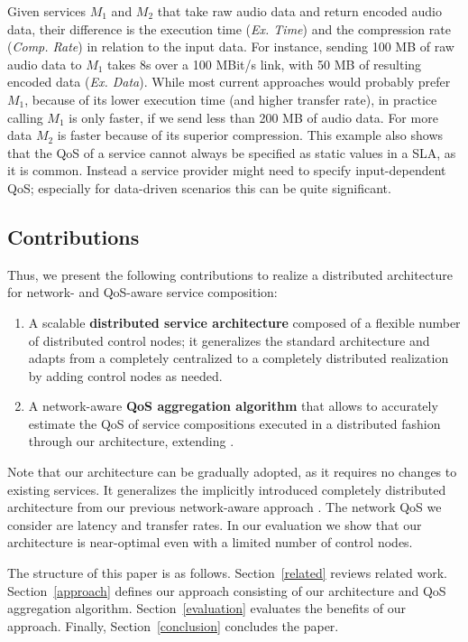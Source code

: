 \documentclass[10pt, conference, compsocconf]{IEEEtran}
\begin{document}
\noindent Given services $M_1$ and $M_2$ that take raw audio data
	and return encoded audio data,
		their difference is the execution time (\textit{Ex. Time}) and the compression rate (\textit{Comp. Rate}) in relation to the input data.
For instance, sending 100 MB of raw audio data to $M_1$ takes 8s over a 100 MBit/s link,
	with 50 MB of resulting encoded data (\textit{Ex. Data}).
While most current approaches would probably prefer $M_1$, because of its lower execution time (and higher transfer rate),
	in practice calling $M_1$ is only faster, if we send less than 200 MB of audio data.
For more data $M_2$ is faster because of its superior compression. 
This example also shows that the QoS of a service cannot always be specified as static values in a SLA,	as it is common.
Instead a service provider might need to specify input-dependent QoS;
	especially for data-driven scenarios this can be quite significant.

\subsection{Contributions}
\noindent Thus, we present the following contributions to realize a distributed architecture for network- and QoS-aware service composition:
\begin{enumerate}
	\item A scalable \textbf{distributed service architecture} composed of a flexible number of distributed control nodes;
			it generalizes the standard architecture and 
			adapts from a completely centralized to a completely distributed realization by adding control nodes as needed.
	\item A network-aware \textbf{QoS aggregation algorithm} that allows to accurately estimate the QoS of service compositions
		executed in a distributed fashion through our architecture,	extending \cite{Klein2012}.
\end{enumerate}
Note that our architecture can be gradually adopted, as it requires no changes to existing services.
It generalizes the implicitly introduced completely distributed architecture from our previous network-aware approach \cite{Klein2012}.
The network QoS we consider are latency and transfer rates.
In our evaluation we show that our architecture is near-optimal even with a limited number of control nodes.

The structure of this paper is as follows.
Section~\ref{related} reviews related work.
Section~\ref{approach} defines our approach consisting of our architecture and QoS aggregation algorithm.
Section~\ref{evaluation} evaluates the benefits of our approach.
Finally, Section~\ref{conclusion} concludes the paper.
\end{document}
